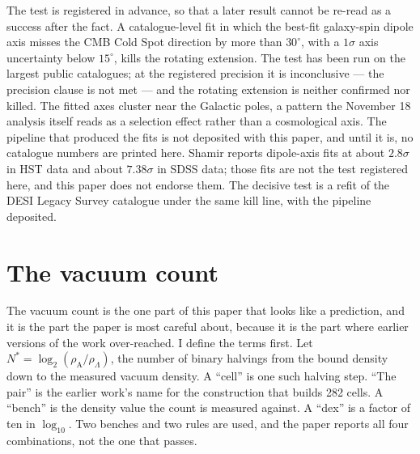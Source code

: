 \documentclass[11pt]{article}
\newcommand{\rhoA}{\rho_{\mathrm{A}}}
\begin{document}
The test is registered in advance, so that a later result cannot be
re-read as a success after the fact. A catalogue-level fit in which the
best-fit galaxy-spin dipole axis misses the CMB Cold Spot direction by
more than $30^\circ$, with a $1\sigma$ axis uncertainty below $15^\circ$,
kills the rotating extension. The test has been run on the largest
public catalogues; at the registered precision it is inconclusive --- the
precision clause is not met --- and the rotating extension is neither
confirmed nor killed. The fitted axes cluster near the Galactic poles,
a pattern the November 18 analysis itself reads as a selection effect
rather than a cosmological axis. The pipeline that produced the fits is
not deposited with this paper, and until it is, no catalogue numbers
are printed here. Shamir \cite{Shamir20} reports dipole-axis fits at
about $2.8\sigma$ in HST data and about $7.38\sigma$ in SDSS data; those
fits are not the test registered here, and this paper does not endorse
them. The decisive test is a refit of the DESI Legacy Survey catalogue
under the same kill line, with the pipeline deposited.

\section{The vacuum count}

The vacuum count is the one part of this paper that looks like a
prediction, and it is the part the paper is most careful about, because
it is the part where earlier versions of the work over-reached. I define
the terms first. Let $N^* = \log_2(\rhoA/\rho_\Lambda)$, the number of
binary halvings from the bound density down to the measured vacuum
density. A ``cell'' is one such halving step. ``The pair'' is the
earlier work's name for the construction that builds 282 cells. A
``bench'' is the density value the count is measured against. A
``dex'' is a factor of ten in $\log_{10}$. Two benches and two rules are
used, and the paper reports all four combinations, not the one that
passes.
\end{document}
